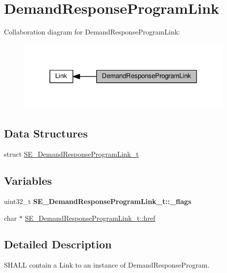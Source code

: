 \hypertarget{group__DemandResponseProgramLink}{}\section{Demand\+Response\+Program\+Link}
\label{group__DemandResponseProgramLink}
Collaboration diagram for Demand\+Response\+Program\+Link\+:\nopagebreak
\begin{figure}[H]
\begin{center}
\leavevmode
\includegraphics[width=303pt]{group__DemandResponseProgramLink}
\end{center}
\end{figure}
\subsection*{Data Structures}
\begin{DoxyCompactItemize}
\item 
struct \hyperlink{structSE__DemandResponseProgramLink__t}{S\+E\+\_\+\+Demand\+Response\+Program\+Link\+\_\+t}
\end{DoxyCompactItemize}
\subsection*{Variables}
\begin{DoxyCompactItemize}
\item 
\mbox{\label{group__DemandResponseProgramLink_gad3c01cd1d64496899f1ca84a7f535e08}} 
uint32\+\_\+t {\bfseries S\+E\+\_\+\+Demand\+Response\+Program\+Link\+\_\+t\+::\+\_\+flags}
\item 
char $\ast$ \hyperlink{group__DemandResponseProgramLink_ga3fb41f1071a2390aac2c1158f71d3d10}{S\+E\+\_\+\+Demand\+Response\+Program\+Link\+\_\+t\+::href}
\end{DoxyCompactItemize}


\subsection{Detailed Description}
S\+H\+A\+LL contain a Link to an instance of Demand\+Response\+Program. 

